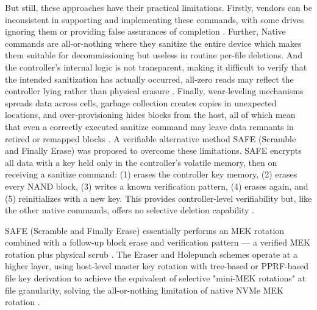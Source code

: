 But still, these approaches have their practical limitations. Firstly, vendors can be inconsistent in 
supporting and implementing these commands, with some drives ignoring them or providing false assurances 
of completion \cite{wang2020challenges}. Further, Native commands are all-or-nothing where they sanitize 
the entire device which makes them suitable for decommissioning but useless in routine per-file deletions.
And the controller's internal logic is not transparent, making it difficult to verify that the intended 
sanitization has actually occurred, all-zero reads may reflect the controller lying rather than physical 
erasure \cite{aronsson2025secure}. Finally, wear-leveling mechanisms spreads data across cells, garbage collection 
creates copies in unexpected locations, and over-provisioning hides blocks from the host, all of which mean that 
even a correctly executed sanitize command may leave data remnants in retired or remapped blocks \cite{aronsson2025secure}.
A verifiable alternative method SAFE (Scramble and Finally Erase) was proposed to overcome these limitations. 
SAFE encrypts all data with a key held only in the controller's volatile memory, then on receiving a 
sanitize command: (1) erases the controller key memory, (2) erases every NAND block, (3) writes a known 
verification pattern, (4) erases again, and (5) reinitializes with a new key. This provides 
controller-level verifiability but, like the other native commands, offers no selective deletion 
capability \cite{reardon2013sok}.

SAFE (Scramble and Finally Erase) essentially performs an MEK rotation combined with a follow-up block 
erase and verification pattern — a verified MEK rotation plus physical scrub \cite{zhang2018ensuring}. The 
Eraser and Holepunch schemes operate at a higher layer, using host-level master key rotation with tree-based 
or PPRF-based file key derivation to achieve the equivalent of selective "mini-MEK rotations" at file 
granularity, solving the all-or-nothing limitation of native NVMe MEK rotation \cite{aronsson2025secure,holepunch}.


